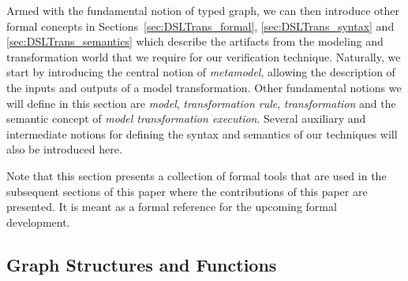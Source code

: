

Armed with the fundamental notion of typed graph, we can then introduce other formal concepts in Sections~\ref{sec:DSLTrans_formal}, \ref{sec:DSLTrans_syntax} and \ref{sec:DSLTrans_semantics} which describe the artifacts from the modeling and transformation world that we require for our verification technique. Naturally, we start by introducing the central notion of \emph{metamodel}, allowing the description of the inputs and outputs of a model transformation. Other fundamental notions we will define in this section are \emph{model}, \emph{transformation rule}, \emph{transformation} and the semantic concept of \emph{model transformation execution}. Several auxiliary and intermediate notions for defining the syntax and semantics of our techniques will also be introduced here. 

Note that this section presents a collection of formal tools that are used in the subsequent sections of this paper where the contributions of this paper are presented. It is meant as a formal reference for the upcoming formal development. %



\newcommand{\defineggprime}{Let $\langle V,E,(s,t),\tau,VT,ET\rangle = g$, and\\ $\langle V',E',(s',t'),\tau',VT',ET'\rangle = g'$, where $g, g' \in \textsc{TG}$.}

\newcommand{\ET}{\mathit{ET}}
\newcommand{\VT}{\mathit{VT}}



\subsection{Graph Structures and Functions}
\label{sec:typed_graphs}


